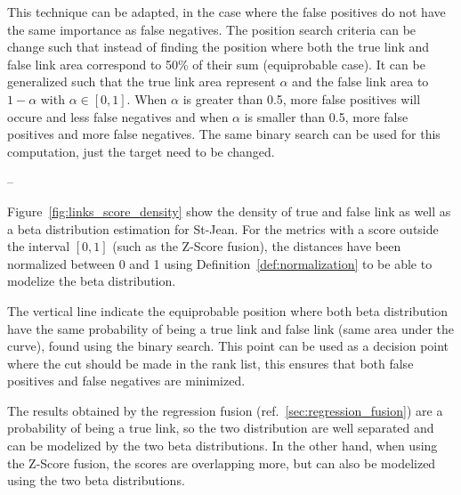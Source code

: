 This technique can be adapted, in the case where the false positives do not have the same importance as false negatives.
The position search criteria can be change such that instead of finding the position where both the true link and false link area correspond to 50\% of their sum (equiprobable case).
It can be generalized such that the true link area represent $\alpha$ and the false link area to $1-\alpha$ with $\alpha \in \left[0,1\right]$.
When $\alpha$ is greater than 0.5, more false positives will occure and less false negatives and when $\alpha$ is smaller than 0.5, more false positives and more false negatives.
The same binary search can be used for this computation, just the target need to be changed.

--

Figure~\ref{fig:links_score_density} show the density of true and false link as well as a beta distribution estimation for St-Jean.
For the metrics with a score outside the interval $[0, 1]$ (such as the Z-Score fusion), the distances have been normalized between 0 and 1 using Definition~\ref{def:normalization} to be able to modelize the beta distribution.

The vertical line indicate the equiprobable position where both beta distribution have the same probability of being a true link and false link (same area under the curve), found using the binary search.
This point can be used as a decision point where the cut should be made in the rank list, this ensures that both false positives and false negatives are minimized.

The results obtained by the regression fusion (ref.~\ref{sec:regression_fusion}) are a probability of being a true link, so the two distribution are well separated and can be modelized by the two beta distributions.
In the other hand, when using the Z-Score fusion, the scores are overlapping more, but can also be modelized using the two beta distributions.

